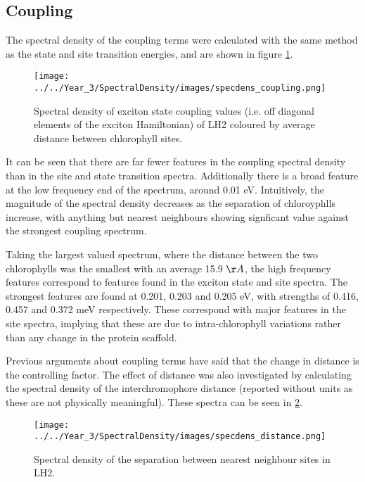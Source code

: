 \afterpartskip
\subsection{Coupling}
\label{subcsec:coupling}

The spectral density of the coupling terms were calculated with the same method
as the state and site transition energies, and are shown in figure \ref{fig:specdens_coupling}.

\begin{figure}
    \centering
    \texttt{[image: ../../Year\_3/SpectralDensity/images/specdens\_coupling.png]}
    \label{fig:specdens_coupling}
    \caption{Spectral density of exciton state coupling values (i.e. off diagonal
    elements of the exciton Hamiltonian) of LH2 coloured by average distance between 
    chlorophyll sites.}
\end{figure}

It can be seen that there are far fewer features in the coupling spectral density
than in the site and state transition spectra. Additionally there is a broad feature
at the low frequency end of the spectrum, around 0.01 eV. Intuitively, the magnitude
of the spectral density decreases as the separation of chloroyphlls increase, with
anything but nearest neighbours showing signficant value against the strongest coupling 
spectrum.

Taking the largest valued spectrum, where the distance between the two chlorophylls
was the smallest with an average 15.9 $\AA{}$, the high frequency features correspond 
to features found in the exciton state and site spectra. The strongest features are 
found at 0.201, 0.203 and 0.205 eV, with strengths of 0.416, 0.457 and 0.372 meV 
respectively. These correspond with major features in the site spectra, implying 
that these are due to intra-chlorophyll variations rather than any change in the
 protein scaffold.

Previous arguments about coupling terms have said that the change in distance is
the controlling factor. The effect of distance was also investigated by calculating
the spectral density of the interchromophore distance (reported without units as 
these are not physically meaningful). These spectra can be seen in \ref{fig:specdens_distance}. 

\begin{figure}
    \centering
    \texttt{[image: ../../Year\_3/SpectralDensity/images/specdens\_distance.png]}
    \label{fig:specdens_distance}
    \caption{Spectral density of the separation between nearest neighbour sites
    in LH2.}
\end{figure}

